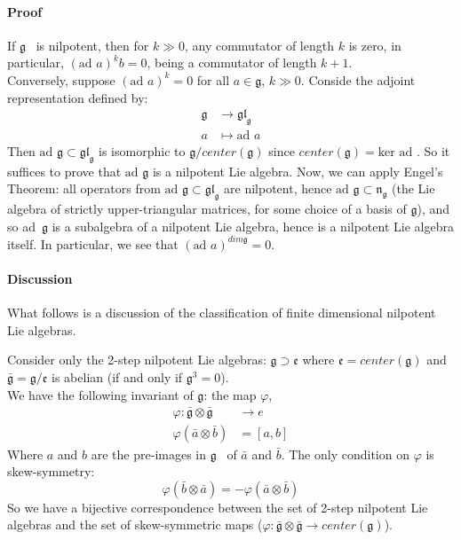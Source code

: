 \documentclass[11pt]{article}
\newcommand{\ad}{\mbox{ad\ }}
\newcommand{\Ker}{\mbox{ker\ }}
\newcommand{\gl}{\ensuremath{\mathfrak{gl}}}
\newcommand{\g}{\ensuremath{\mathfrak{g}}}
\newcommand{\nk}{\ensuremath{\mathfrak{n}}}
\begin{document}
\paragraph{Proof} If \g ~ is nilpotent, then for $k \gg 0$, any commutator of length
$k$ is zero, in particular, $(\ad{a})^kb=0$, being a commutator of length $k+1$. \\
Conversely, suppose $(\ad{a})^k = 0$ for all $a \in \g$, $k \gg 0$. Conside the
adjoint representation defined by:
\begin{align}
\g & \rightarrow \gl_{\g} \\
a & \mapsto \ad{a}
\end{align}
Then $\ad{\g} \subset \gl_{\g}$ is isomorphic to $\g/center(\g)$ since $center(\g) = \Ker \ad$.
So it suffices to prove that $\ad{\g}$ is a nilpotent Lie algebra. Now, we can apply Engel's 
Theorem: all operators from $\ad{\g} \subset \gl_{\g}$ are nilpotent, hence 
$\ad{\g} \subset \nk_{\g}$ (the Lie algebra of strictly upper-triangular matrices, for some choice
of a basis of \g), and so \ad{\g} is a subalgebra of a nilpotent Lie algebra, hence is a nilpotent
Lie algebra itself. In particular, we see that $(\ad{a})^{dim \g}=0$.

\paragraph{Discussion} What follows is a discussion of the classification of finite dimensional 
nilpotent Lie algebras.

Consider only the 2-step nilpotent Lie algebras: $\g \supset \mathfrak{e}$ where $\mathfrak{e}=center(\g)$ and 
$\bar{\g} = \g/\mathfrak{e}$ is abelian (if and only if $\g^3 = 0$). \\
We have the following invariant of \g : the map $\varphi$,
\begin{align}
\varphi : \bar{\g} \otimes \bar{\g} & \rightarrow e \\
\varphi(\bar{a} \otimes \bar{b}) & = [a,b]
\end{align}
Where $a$ and $b$ are the pre-images in \g~ of $\bar{a}$ and $\bar{b}$.
The only condition on $\varphi$ is skew-symmetry:
\begin{equation}
\varphi(\bar{b} \otimes \bar{a}) = -\varphi(\bar{a} \otimes \bar{b})
\end{equation}
So we have a bijective correspondence between the set of 2-step nilpotent Lie algebras and the
set of skew-symmetric maps ($\varphi: \bar{\g} \otimes \bar{\g} \rightarrow center(\g)$).
\end{document}
